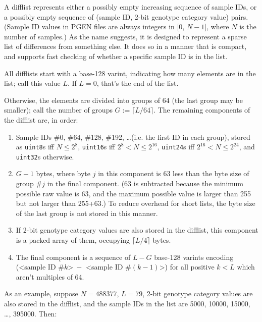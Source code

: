 \documentclass[8pt]{article}
\begin{document}
A difflist represents either a possibly empty increasing sequence of sample
IDs, or a possibly empty sequence of (sample ID, 2-bit genotype category value)
pairs.  (Sample ID values in PGEN files are always integers in [0, $N-1$],
where $N$ is the number of samples.)  As the name suggests, it is designed to
represent a sparse list of differences from something else.  It does so in a
manner that is compact, and supports fast checking of whether a specific sample
ID is in the list.

All difflists start with a base-128 varint, indicating how many elements are in
the list; call this value $L$.  If $L=0$, that's the end of the list.

Otherwise, the elements are divided into groups of 64 (the last group may be
smaller); call the number of groups $G:=\lceil L/64\rceil $.  The remaining
components of the difflist are, in order:

\begin{enumerate}
\item Sample IDs \#0, \#64, \#128, \#192, \ldots (i.e. the first ID in each
  group), stored as \texttt{uint8}s iff $N\leq 2^8$, \texttt{uint16}s iff
  $2^8<N\leq 2^{16}$, \texttt{uint24}s iff $2^{16}<N\leq 2^{24}$, and
  \texttt{uint32}s otherwise.
\item $G-1$ bytes, where byte $j$ in this component is 63 less than the byte
  size of group \#$j$ in the final component.  (63 is subtracted because the
  minimum possible raw value is 63, and the maximum possible value is larger
  than 255 but not larger than 255+63.)  To reduce overhead for short lists,
  the byte size of the last group is not stored in this manner.
\item If 2-bit genotype category values are also stored in the difflist, this
  component is a packed array of them, occupying $\lceil L/4\rceil $ bytes.
\item The final component is a sequence of $L-G$ base-128 varints encoding
  (\textless sample ID \#$k$\textgreater $\>-$ \textless sample ID
  \#$(k-1)$\textgreater) for all positive $k<L$ which aren't multiples of 64.
\end{enumerate}

As an example, suppose $N=488377$, $L=79$, 2-bit genotype category values are
also stored in the difflist, and the sample IDs in the list are 5000, 10000,
15000, \ldots , 395000.  Then:
\end{document}
